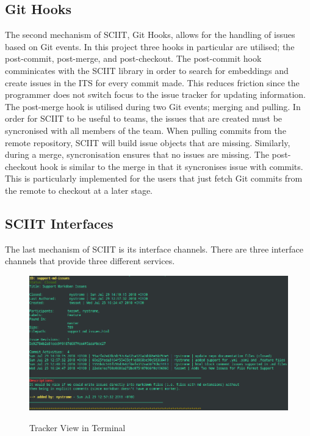 \documentclass{mproj}
\begin{document}

\subsection{Git Hooks}

The second mechanism of SCIIT, Git Hooks, allows for the handling of issues based on Git events. In this project three hooks in particular are utilised; the post-commit, post-merge, and post-checkout. The post-commit hook comminicates with the SCIIT library in order to search for embeddings and create issues in the ITS for every commit made. This reduces friction since the programmer does not switch focus to the issue tracker for updating information. The post-merge hook is utilised during two Git events; merging and pulling. In order for SCIIT to be useful to teams, the issues that are created must be syncronised with all members of the team. When pulling commits from the remote repository, SCIIT will build issue objects that are missing. Similarly, during a merge, syncronisation ensures that no issues are missing. The post-checkout hook is similar to the merge in that it syncronises issue with commits. This is particularly implemented for the users that just fetch Git commits from the remote to checkout at a later stage.

\subsection{SCIIT Interfaces}

The last mechanism of SCIIT is its interface channels. There are three interface channels that provide three different services. 

\begin{figure}
\centering
  \caption{Tracker View in Terminal}
  \includegraphics[width=15cm]{sciit-tracker-shot}
  \label{fig:sciit-tracker-shot}
\end{figure}
\end{document}
